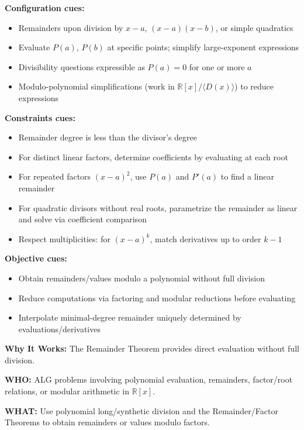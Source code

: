 \documentclass[12pt]{article}
\begin{document}
\textbf{Configuration cues:}
\begin{itemize}
    \item Remainders upon division by \(x-a\), \((x-a)(x-b)\), or simple quadratics
    \item Evaluate \(P(a)\), \(P(b)\) at specific points; simplify large-exponent expressions
    \item Divisibility questions expressible as \(P(a)=0\) for one or more \(a\)
    \item Modulo-polynomial simplifications (work in \(\mathbb{R}[x]/\langle D(x)\rangle\)) to reduce expressions
\end{itemize}

\textbf{Constraints cues:}
\begin{itemize}
    \item Remainder degree is less than the divisor's degree
    \item For distinct linear factors, determine coefficients by evaluating at each root
    \item For repeated factors \((x-a)^2\), use \(P(a)\) and \(P'(a)\) to find a linear remainder
    \item For quadratic divisors without real roots, parametrize the remainder as linear and solve via coefficient comparison
    \item Respect multiplicities: for \((x-a)^k\), match derivatives up to order \(k-1\)
\end{itemize}

\textbf{Objective cues:}
\begin{itemize}
    \item Obtain remainders/values modulo a polynomial without full division
    \item Reduce computations via factoring and modular reductions before evaluating
    \item Interpolate minimal-degree remainder uniquely determined by evaluations/derivatives
\end{itemize}

\textbf{Why It Works:} The Remainder Theorem provides direct evaluation without full division.

\textbf{WHO:} ALG problems involving polynomial evaluation, remainders, factor/root relations, or modular arithmetic in \(\mathbb{R}[x]\).

\textbf{WHAT:} Use polynomial long/synthetic division and the Remainder/Factor Theorems to obtain remainders or values modulo factors.
\end{document}
